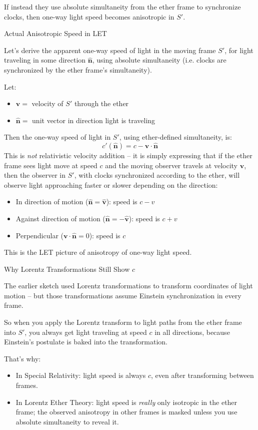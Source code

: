 \documentclass[a4paper]{article}
\theoremstyle{plain}
\theoremstyle{definition}
\newcommand{\vect}[1]{\mathbf{#1}}
\newcommand{\hatvec}[1]{\hat{\mathbf{#1}}}
\begin{document}
If instead they use absolute simultaneity from the ether frame to
synchronize clocks, then one-way light speed becomes anisotropic in
$S'$.

Actual Anisotropic Speed in LET

Let's derive the apparent one-way speed of light in the moving frame
$S'$, for light traveling in some direction $\hatvec{n}$, using
absolute simultaneity (i.e. clocks are synchronized by the ether
frame’s simultaneity).

Let:
\begin{itemize}
\item $\vect{v} =$ velocity of $S'$ through the ether
\item $\hatvec{n} =$ unit vector in direction light is traveling
\end{itemize}
Then the one-way speed of light in $S'$, using ether-defined
simultaneity, is:
\begin{equation}
c'(\hatvec{n}) = c - \vect{v} \cdot \hatvec{n}
\end{equation}
This is {\em not} relativistic velocity addition -- it is simply
expressing that if the ether frame sees light move at speed $c$ and
the moving observer travels at velocity $\vect{v}$, then the observer
in $S'$, with clocks synchronized according to the ether, will observe
light approaching faster or slower depending on the direction:
\begin{itemize}
\item In direction of motion ($\hatvec{n} = \hatvec{v}$): speed is
  $c-v$
\item Against direction of motion ($\hatvec{n} = -\hatvec{v}$): speed
  is $c+v$
\item Perpendicular ($\vect{v} \cdot \hatvec{n} = 0$): speed is $c$
\end{itemize}
This is the LET picture of anisotropy of one-way light speed.

Why Lorentz Transformations Still Show $c$

The earlier sketch used Lorentz transformations to transform
coordinates of light motion -- but those transformations assume
Einstein synchronization in every frame.

So when you apply the Lorentz transform to light paths from the ether
frame into $S'$, you always get light traveling at speed $c$ in all
directions, because Einstein's postulate is baked into the
transformation.

That's why:
\begin{itemize}
\item In Special Relativity: light speed is always $c$, even after
  transforming between frames.
\item In Lorentz Ether Theory: light speed is {\em really} only
  isotropic in the ether frame; the observed anisotropy in other
  frames is masked unless you use absolute simultaneity to reveal it.
\end{itemize}
\end{document}
